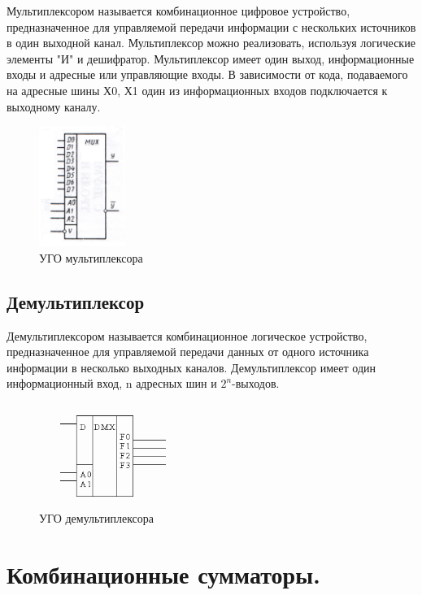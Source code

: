 \documentclass[unicode, 12pt, a4paper, oneside]{article}
\begin{document}
Мультиплексором называется комбинационное цифровое устройство, предназначенное для управляемой передачи информации с нескольких источников в один выходной канал. Мультиплексор можно реализовать, используя логические элементы "И" и дешифратор. Мультиплексор имеет один выход, информационные входы и адресные или управляющие входы. В зависимости от кода, подаваемого на адресные шины Х0, Х1 один из информационных входов подключается к выходному каналу.
\begin{figure}[H]
\centering
\includegraphics[width=0.25\textwidth]{11_ms.jpg}
\caption{УГО мультиплексора}
\label{fig:11_ms}
\end{figure}

\subsection*{Демультиплексор}

Демультиплексором называется комбинационное логическое устройство, предназначенное для управляемой передачи данных от одного источника информации в несколько выходных каналов. Демультиплексор имеет один информационный вход, n адресных шин и $2^{n}$-выходов.
\begin{figure}[H]
\centering
\includegraphics[width=0.45\textwidth]{11_dmx.png}
\caption{УГО демультиплексора}
\label{fig:11_dmx}
\end{figure}


\section{Комбинационные сумматоры.}
\end{document}
